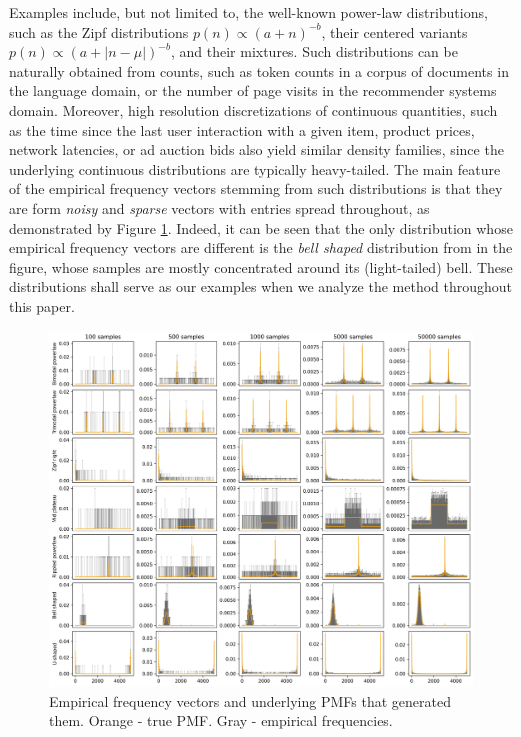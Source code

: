 \documentclass[10pt]{article} %
\begin{document}
Examples include, but not limited to, the well-known power-law distributions, such as the Zipf distributions $p(n)\propto (a+n)^{-b}$, their centered variants $p(n) \propto (a + |n - \mu|)^{-b}$, and their mixtures. Such distributions can be naturally obtained from counts, such as token counts in a corpus of documents in the language domain, or the number of page visits in the recommender systems domain. Moreover, high resolution discretizations of continuous quantities, such as the time since the last user interaction with a given item, product prices, network latencies, or ad auction bids also yield similar density families, since the underlying continuous distributions are typically heavy-tailed. The main feature of the empirical frequency vectors stemming from such distributions is that they are form \emph{noisy} and \emph{sparse} vectors with entries spread throughout, as demonstrated by Figure \ref{fig:distributions}. Indeed, it can be seen that the only distribution whose empirical frequency vectors are different is the \emph{bell shaped} distribution from in the figure, whose samples are mostly concentrated around its (light-tailed) bell. These distributions shall serve as our examples when we analyze the method throughout this paper.

\begin{figure}[tbh]
    \centering
    \includegraphics[width=\textwidth]{distributions}
    \caption{Empirical frequency vectors and underlying PMFs that generated them. Orange - true PMF. Gray - empirical frequencies.}
    \label{fig:distributions}
\end{figure}
\end{document}
